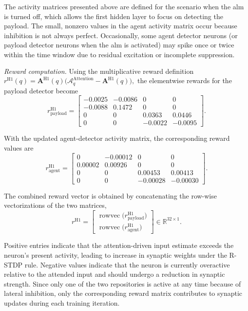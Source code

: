 The activity matrices presented above are defined for the scenario when the \ac{alm} is turned off, which allows the first hidden layer to focus on detecting the payload. The small, nonzero values in the agent activity matrix occur because inhibition is not always perfect. Occasionally, some agent detector neurons (or payload detector neurons when the \ac{alm} is activated) may spike once or twice within the time window due to residual excitation or incomplete suppression.

\emph{Reward computation.}
Using the multiplicative reward definition
\(
r^{\text{H1}}(q) = \mathbf{A}^{\text{H1}}(q)\big(\mathcal{A}_{q}^{\text{Attention}} - \mathbf{A}^{\text{H1}}(q)\big),
\)
the elementwise rewards for the payload detector become
\[
r^{\text{H1}}_{\text{payload}}
=
\begin{bmatrix}
-0.0025 & -0.0086 & 0       & 0       \\
-0.0088 & 0.1472  & 0       & 0       \\
0       & 0       & 0.0363  & 0.0446  \\
0       & 0       & -0.0022 & -0.0095
\end{bmatrix}.
\]

With the updated agent-detector activity matrix, the corresponding reward values are
\[
r^{\text{H1}}_{\text{agent}}
=
\begin{bmatrix}
0        & -0.00012 & 0        & 0         \\
0.00002  & 0.00926  & 0        & 0         \\
0        & 0        & 0.00453  & 0.00413   \\
0        & 0        & -0.00028 & -0.00030
\end{bmatrix}.
\]

The combined reward vector is obtained by concatenating the
row-wise vectorizations of the two matrices,
\[
r^{\text{H1}}
=
\begin{bmatrix}
\operatorname{rowvec}\!\big(r^{\text{H1}}_{\text{payload}}\big) \\
\operatorname{rowvec}\!\big(r^{\text{H1}}_{\text{agent}}\big)
\end{bmatrix}
\in \mathbb{R}^{32\times 1}.
\]


Positive entries indicate that the attention-driven input estimate exceeds the neuron's present activity, leading to increase in synaptic weights under the R-STDP rule. Negative values indicate that the neuron is currently overactive relative to the attended input and should undergo a reduction in synaptic strength. Since only one of the two repositories is active at any time because of lateral inhibition, only the corresponding reward matrix contributes to synaptic updates during each training iteration.


